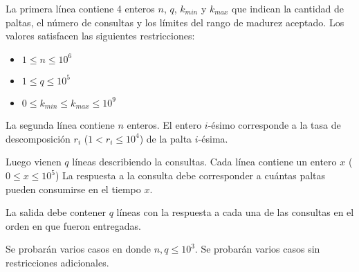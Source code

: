 \documentclass{oci}
\begin{document}
\begin{inputDescription}

La primera línea contiene 4 enteros
$n$, $q$, $k_{min}$ y $k_{max}$
que indican la cantidad de paltas, el número de consultas y los límites del rango de madurez aceptado.
Los valores satisfacen las siguientes restricciones:

\begin{itemize}
  \item $1 \leq n \leq 10^6$
  \item $1 \leq q \leq 10^5$
  \item $0 \leq k_{min} \leq k_{max} \leq 10^9$
\end{itemize}

La segunda línea contiene $n$ enteros.
El entero $i$-ésimo corresponde a la tasa de descomposición $r_i$ ($1 < r_i \leq 10^4$)
de la palta $i$-ésima.

Luego vienen $q$ líneas describiendo la consultas.
Cada línea contiene un entero $x$ ($0 \leq x \leq 10^5$)
La respuesta a la consulta debe corresponder a cuántas paltas pueden consumirse
en el tiempo $x$.

\end{inputDescription}

\begin{outputDescription}
La salida debe contener $q$ líneas con la respuesta a cada una de las consultas en el orden en que
fueron entregadas.
\end{outputDescription}

\begin{scoreDescription}
  Se probarán varios casos en donde $n, q \leq 10^3$.
  Se probarán varios casos sin restricciones adicionales.
\end{scoreDescription}
\end{document}
